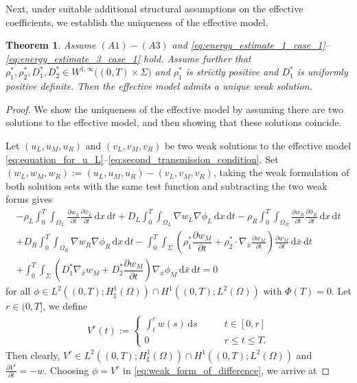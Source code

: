 \documentclass[11pt]{article}
\newtheorem{theorem}{Theorem}
\def\mor{\Omega_R}
\def\mol{\Omega_L}
\def\p{\partial}
\newcommand{\di}[1]{\,\mathrm{d}#1}
\begin{document}
    Next, under suitable additional structural assumptions on the effective coefficients, we establish the uniqueness of the effective model.
\begin{theorem}
     Assume $(A1)-(A3)$ and \eqref{eq:energy_estimate_1_case_1}--\eqref{eq:energy_estimate_3_case_1} hold. Assume further that $\rho_1^*,\rho_2^*,D_1^*,D_2^*
\in W^{1,\infty}\bigl((0,T)\times\Sigma\bigr)$ and $\rho_1^*$ is strictly positive and $D_1^*$ is uniformly positive definite. Then the  effective model admits a unique weak solution.
\end{theorem}
\begin{proof}
    We show the uniqueness of the effective model by assuming there are two solutions to the effective model, and then showing that these solutions coincide. 

    Let $(u_L,u_M,u_R)$ and $(v_L,v_M,v_R)$ be two weak solutions to the effective model \eqref{eq:equation_for_u_L}--\eqref{eq:second_transmission_condition}. Set $(w_L,w_M,w_R):=(u_L,u_M,u_R)-(v_L,v_M,v_R)$, taking the weak formulation of both solution sets with the same test function and subtracting the two weak forms gives
    \begin{multline}\label{eq:weak_form_of_difference}
        -\rho_L\int_0^T\int_{\mol}\frac{\p w_L}{\p t}\frac{\p \phi_L}{\p t}\di{x}\di{t}+D_L\int_0^T\int_{\mol}\nabla w_L\nabla \phi_L\di{x}\di{t}-\rho_R\int_0^T\int_{\mor}\frac{\p w_R}{\p t}\frac{\p \phi_R}{\p t}\di{x}\di{t}\\
        +D_R\int_0^T\int_{\mor}\nabla w_R\nabla \phi_R\di{x}\di{t}
        -\int_0^T\int_\Sigma \left(\rho_{1}^*\dfrac{\partial w_M}{\partial t}+\rho_{2}^*\cdot \nabla_{\bar x}\frac{\p w_M}{\p t}\right)\frac{\p w_M}{\p t}\di{\bar x}\di{t}
        \\ +\int_0^T\int_{\Sigma}\left(D_1^* \nabla_{\bar x}w_M+D_2^*\dfrac{\partial w_M}{\partial t}\right)\nabla_{\bar x}\phi_M\di{\bar x}\di{t}=0
    \end{multline} 
    for all $\phi\in L^2((0,T);H^1_{\sharp}(\Omega))\cap H^1((0,T);L^2(\Omega))$ with $\Phi(T)=0$.
Let $r\in (0,T]$, we define 
\begin{align*}
    V^r (t):=\begin{cases}
        \int_t^r w(s)\di{s} \qquad &t\in [0,r]\\
        0\qquad &r\leq t\leq T.
    \end{cases}
\end{align*}
Then clearly, $V^r\in L^2((0,T);H^1_{\sharp}(\Omega))\cap H^1((0,T);L^2(\Omega))$ and $\frac{\p V^r}{\p t}=-w$. Choosing $\phi=V^r$ in \eqref{eq:weak_form_of_difference}, we arrive at

\end{proof}
\end{document}
